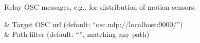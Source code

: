 Relay OSC messages, e.g., for distribution of motion sensors.

\begin{tscattributes}
   & Target OSC url (default: ``osc.udp://localhost:9000/'')\\
   & Path filter (default: ``'', matching any path)\\
\end{tscattributes}
